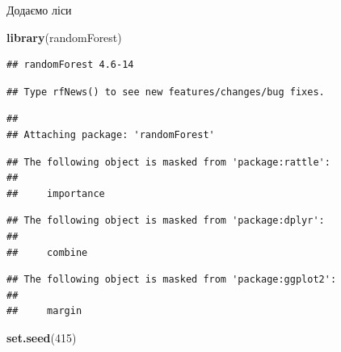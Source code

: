 \documentclass[ignorenonframetext,]{beamer}
\newenvironment{Shaded}{\begin{snugshade}}{\end{snugshade}}
\newcommand{\DecValTok}[1]{\textcolor[rgb]{0.00,0.00,0.81}{#1}}
\newcommand{\KeywordTok}[1]{\textcolor[rgb]{0.13,0.29,0.53}{\textbf{#1}}}
\newcommand{\NormalTok}[1]{#1}
\begin{document}
\begin{frame}[fragile]{Додаємо ліси}
\protect\hypertarget{ux434ux43eux434ux430ux454ux43cux43e-ux43bux456ux441ux438}{}

\begin{Shaded}
\begin{Highlighting}[]
\KeywordTok{library}\NormalTok{(randomForest)}
\end{Highlighting}
\end{Shaded}

\begin{verbatim}
## randomForest 4.6-14
\end{verbatim}

\begin{verbatim}
## Type rfNews() to see new features/changes/bug fixes.
\end{verbatim}

\begin{verbatim}
## 
## Attaching package: 'randomForest'
\end{verbatim}

\begin{verbatim}
## The following object is masked from 'package:rattle':
## 
##     importance
\end{verbatim}

\begin{verbatim}
## The following object is masked from 'package:dplyr':
## 
##     combine
\end{verbatim}

\begin{verbatim}
## The following object is masked from 'package:ggplot2':
## 
##     margin
\end{verbatim}

\begin{Shaded}
\begin{Highlighting}[]
\KeywordTok{set.seed}\NormalTok{(}\DecValTok{415}\NormalTok{)}
\end{Highlighting}
\end{Shaded}

\end{frame}
\end{document}
